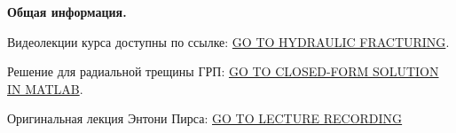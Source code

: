 \documentclass[main.tex]{subfiles}
\begin{document}
\textbf{Общая информация.}

Видеолекции курса доступны по ссылке: \href{https://youtube.com/playlist?list=PLipUmK_65GXEpFTHhfJBaiiv7XiwMg-PM}{GO TO HYDRAULIC FRACTURING}.

Решение для радиальной трещины ГРП: \href{https://datadryad.org/stash/dataset/doi:10.5061/dryad.gh469}{GO TO CLOSED-FORM SOLUTION IN MATLAB}.

Оригинальная лекция Энтони Пирса: \href{https://www.youtube.com/watch?v=PXfy5f9kWh4}{GO TO LECTURE RECORDING}
\end{document}
